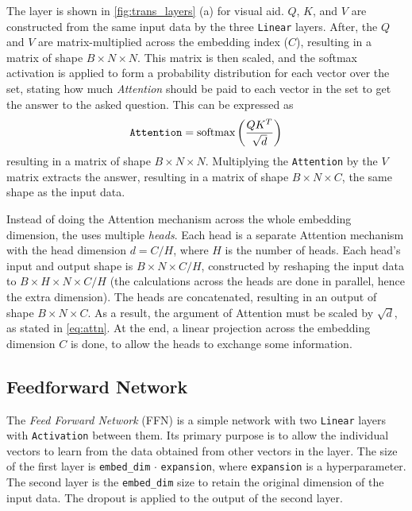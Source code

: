 The \MHSA layer is shown in \cref{fig:trans_layers} (a) for visual aid. 
$Q$, $K$, and $V$ are constructed from the same input data by the three \texttt{Linear} layers.
After, the $Q$ and $V$ are matrix-multiplied across the embedding index ($C$), resulting in a matrix of shape $B \times N \times N$.
This matrix is then scaled, and the softmax activation is applied to form a probability distribution for each vector over the set, stating how much \emph{Attention} should be paid to each vector in the set to get the answer to the asked question.
This can be expressed as 
\begin{equation}
    \label{eq:attn}
    \text{\texttt{Attention}} = \text{softmax}\left(\frac{QK^T}{\sqrt{d}}\right)
\end{equation}
resulting in a matrix of shape $B \times N \times N$.
Multiplying the \texttt{Attention} by the $V$ matrix extracts the answer, resulting in a  matrix of shape $B \times N \times C$, the same shape as the input data.

Instead of doing the Attention mechanism across the whole embedding dimension, the \trans uses multiple \emph{heads}.
Each head is a separate Attention mechanism with the head dimension $d = C / H$, where $H$ is the number of heads. 
Each head's input and output shape is $B \times N \times C/H$, constructed by reshaping the input data to $B \times H \times N \times C/H$ (the calculations across the heads are done in parallel, hence the extra dimension).
The heads are concatenated, resulting in an output of shape $B \times N \times C$.
As a result, the argument of Attention must be scaled by $\sqrt{d}$, as stated in \cref{eq:attn}.
At the end, a linear projection across the embedding dimension $C$ is done, to allow the heads to exchange some information. 

\subsection{Feedforward Network}
\label{sec:ffn}
The \emph{Feed Forward Network} (FFN) is a simple network with two \texttt{Linear} layers with \texttt{Activation} between them.
Its primary purpose is to allow the individual vectors to learn from the data obtained from other vectors in the \MHSA layer. 
The size of the first layer is \texttt{embed\_dim} $\cdot$ \texttt{expansion}, where \texttt{expansion} is a hyperparameter.
The second layer is the \texttt{embed\_dim} size to retain the original dimension of the input data.
The dropout is applied to the output of the second layer.


